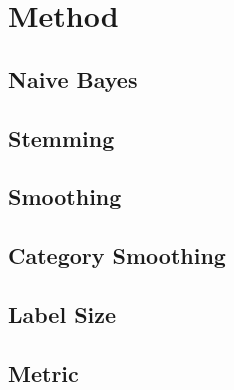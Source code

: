 \section{Method}

\subsection{Naive Bayes}

\subsection{Stemming}

\subsection{Smoothing}

\subsection{Category Smoothing}

\subsection{Label Size}

\subsection{Metric}
